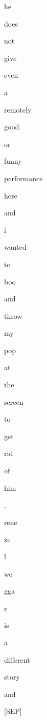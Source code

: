 \documentclass[varwidth=150mm]{standalone}
\begin{document}
\begin{CJK*}{UTF8}{gbsn}
{{{\colorbox{red!4.851043224334717}{\strut he} \colorbox{red!5.830684661865234}{\strut does} \colorbox{red!8.80727481842041}{\strut not} \colorbox{red!1.1055634021759033}{\strut give} \colorbox{red!2.6142585277557373}{\strut even} \colorbox{red!0.0}{\strut a} \colorbox{red!1.8145685195922852}{\strut remotely} \colorbox{red!1.1577873229980469}{\strut good} \colorbox{red!3.7344088554382324}{\strut or} \colorbox{red!4.46065616607666}{\strut funny} \colorbox{red!11.943233489990234}{\strut performance} \colorbox{red!4.795966148376465}{\strut here} \colorbox{red!28.63866424560547}{\strut and} \colorbox{red!27.976558685302734}{\strut i} \colorbox{red!3.9121103286743164}{\strut wanted} \colorbox{red!0.0}{\strut to} \colorbox{red!0.0}{\strut boo} \colorbox{red!3.3641834259033203}{\strut and} \colorbox{red!0.0}{\strut throw} \colorbox{red!6.901957035064697}{\strut my} \colorbox{red!12.994022369384766}{\strut pop} \colorbox{red!0.0}{\strut at} \colorbox{red!0.0}{\strut the} \colorbox{red!3.353428602218628}{\strut screen} \colorbox{red!1.323765754699707}{\strut to} \colorbox{red!0.0}{\strut get} \colorbox{red!1.4432528018951416}{\strut rid} \colorbox{red!0.0}{\strut of} \colorbox{red!0.0}{\strut him} \colorbox{red!0.0}{\strut .} \colorbox{red!56.4304084777832}{\strut rene} \colorbox{red!4.263099193572998}{\strut ze}\colorbox{red!8.10421371459961}{\strut l}\colorbox{red!14.610899925231934}{\strut we}\colorbox{red!26.20001983642578}{\strut gga}\colorbox{red!54.14384460449219}{\strut r} \colorbox{red!38.93670654296875}{\strut is} \colorbox{red!30.943584442138672}{\strut a} \colorbox{red!10.219513893127441}{\strut different} \colorbox{red!5.147716999053955}{\strut story} \colorbox{red!50.79554748535156}{\strut and} \colorbox{red!3.3606958389282227}{\strut [SEP]}
}}}
\end{CJK*}
\end{document}
